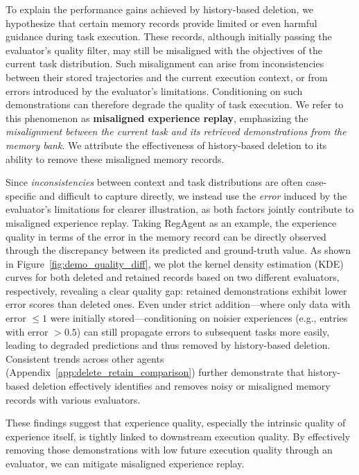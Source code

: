\documentclass[11pt]{article}
\theoremstyle{plain}
\theoremstyle{definition}
\begin{document}
{To explain the performance gains achieved by history-based deletion, we hypothesize that certain memory records provide limited or even harmful guidance during task execution.
{
These records, although initially passing the evaluator’s quality filter, may still be misaligned with the objectives of the current task distribution. Such misalignment can arise from inconsistencies between their stored trajectories and the current execution context, or from errors introduced by the evaluator’s limitations. Conditioning on such demonstrations can therefore degrade the quality of task execution.
}
We refer to this phenomenon as \textbf{misaligned experience replay}, emphasizing the \textit{misalignment between the current task and its retrieved demonstrations from the memory bank}.
We attribute the effectiveness of history-based deletion to its ability to remove these misaligned memory records.

{
Since \textit{inconsistencies} between context and task distributions are often case-specific and difficult to capture directly, we instead use the \textit{error} induced by the evaluator’s limitations for clearer illustration, as both factors jointly contribute to misaligned experience replay.
Taking {RegAgent} as an example, the experience quality in terms of the error in the memory record can be directly observed through the discrepancy between its predicted and ground-truth value.
As shown in Figure~\ref{fig:demo_quality_diff}, we plot the kernel density estimation (KDE) curves for both deleted and retained records based on two different evaluators, respectively,
revealing a clear quality gap: retained demonstrations exhibit lower error scores than deleted ones.
Even under strict addition—where only data with error $\le 1$ were initially stored—conditioning on noisier experiences (e.g., entries with error $> 0.5$) can still propagate errors to subsequent tasks more easily, leading to degraded predictions and thus removed by history-based deletion.
Consistent trends across other agents (Appendix~\ref{app:delete_retain_comparison}) further demonstrate that history-based deletion effectively identifies and removes noisy or misaligned memory records with various evaluators.

These findings suggest that experience quality, especially the intrinsic quality of experience itself, is tightly linked to downstream execution quality. 
By effectively removing those demonstrations with low future execution quality through an evaluator, we can mitigate misaligned experience replay.
}

}
\end{document}
